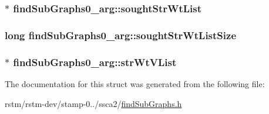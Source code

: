 \hypertarget{structfindSubGraphs0__arg_af6415f605238c71e9fbb391bc8425137}{
\subsubsection[{sought\-Str\-Wt\-List}]{$\ast$ find\-Sub\-Graphs0\-\_\-arg\-::sought\-Str\-Wt\-List}}\label{structfindSubGraphs0__arg_af6415f605238c71e9fbb391bc8425137}
\hypertarget{structfindSubGraphs0__arg_a5ee9928a3be6cc59ed7a5b864ef4c4c9}{
\subsubsection[{sought\-Str\-Wt\-List\-Size}]{\setlength{\rightskip}{0pt plus 5cm}long find\-Sub\-Graphs0\-\_\-arg\-::sought\-Str\-Wt\-List\-Size}}\label{structfindSubGraphs0__arg_a5ee9928a3be6cc59ed7a5b864ef4c4c9}
\hypertarget{structfindSubGraphs0__arg_a5cfb522d5c47913082c53493c11c9eaa}{
\subsubsection[{str\-Wt\-V\-List}]{$\ast$ find\-Sub\-Graphs0\-\_\-arg\-::str\-Wt\-V\-List}}\label{structfindSubGraphs0__arg_a5cfb522d5c47913082c53493c11c9eaa}


The documentation for this struct was generated from the following file\-:\begin{DoxyCompactItemize}
\item 
rstm/rstm-\/dev/stamp-\/0../ssca2/\hyperlink{findSubGraphs_8h}{find\-Sub\-Graphs.\-h}\end{DoxyCompactItemize}
